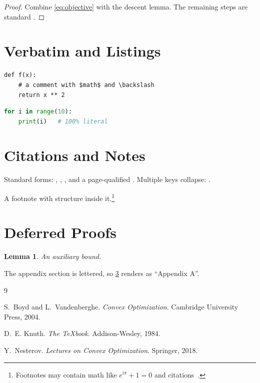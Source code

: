 \documentclass[11pt,twoside]{article}
\newtheorem{lemma}[theorem]{Lemma}
\begin{document}
\begin{proof}
  Combine \eqref{eq:objective} with the descent lemma. The remaining steps are
  standard \citep{boyd2004convex}.
\end{proof}

\section{Verbatim and Listings}
\label{sec:code}

\begin{verbatim}
def f(x):
    # a comment with $math$ and \backslash
    return x ** 2
\end{verbatim}

\begin{lstlisting}[language=Python,caption={A listing}]
for i in range(10):
    print(i)   # 100% literal
\end{lstlisting}

\section{Citations and Notes}
\label{sec:cites}

Standard forms: \cite{knuth1984texbook}, \citep{boyd2004convex},
\citet{nesterov2018lectures}, and a page-qualified
\citep[see][p.~42]{boyd2004convex}. Multiple keys collapse:
\citep{boyd2004convex,nesterov2018lectures}.

A footnote with structure inside it.\footnote{Footnotes may contain math like
$e^{i\pi} + 1 = 0$ and citations~\citep{knuth1984texbook}.}

\appendix

\section{Deferred Proofs}
\label{app:proofs}

\begin{lemma}
  \label{lem:aux}
  An auxiliary bound.
\end{lemma}

The appendix section is lettered, so \cref{app:proofs} renders as ``Appendix A''.

\begin{thebibliography}{9}

S.~Boyd and L.~Vandenberghe.
\newblock \emph{Convex Optimization}.
\newblock Cambridge University Press, 2004.

D.~E. Knuth.
\newblock \emph{The \TeX{}book}.
\newblock Addison-Wesley, 1984.

Y.~Nesterov.
\newblock \emph{Lectures on Convex Optimization}.
\newblock Springer, 2018.

\end{thebibliography}
\end{document}
